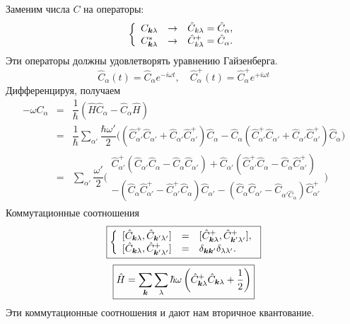 Заменим числа $C$ на операторы:
$$
\left\{
  \begin{array}{lcl}
    C_{\bf k \lambda} & \to & \hat C_{k \lambda} = \hat C_{\alpha} ,\\
    C^\ast_{\bf k \lambda} & \to & \hat C_{k \lambda}^{+} = \hat C_{\alpha} .
  \end{array}
\right.
$$ 
Эти операторы должны удовлетворять уравнению Гайзенберга.
$$
    \hat C_{\alpha} (t) = \hat C_{\alpha} e^{- i \omega t}, \quad
    \hat C_{\alpha}^{+} (t) = \hat C_{\alpha}^+ e^{+ i \omega t}
$$
Дифференцируя, получаем
\begin{eqnarray*}
    - \omega C_{\alpha} &=& \dfrac{1}{\hbar} (\hat H \hat C_{\alpha} - \hat C_{\alpha} \hat H)\\
&=& \dfrac{1}{\hbar} \sum_{\alpha'} \dfrac{\hbar \omega'}{2}\Big(
    (\hat C_{\alpha'}^{+} \hat C_{\alpha'} + \hat C_{\alpha'} \hat C_{\alpha'}^{+}) \hat C_{\alpha} - 
\hat C_{\alpha}(\hat C_{\alpha'}^{+} \hat C_{\alpha'} + \hat C_{\alpha'} \hat C_{\alpha'}^{+}) \hat C_{\alpha}
\Big)\\
&=& \sum_{\alpha'} \dfrac{\omega'}{2} \Big(
\begin{array}{c}
      \hat C_{\alpha'}^{+} (\hat C_{\alpha'} \hat C_{\alpha} - \hat C_{\alpha} \hat C_{\alpha'}) +
\hat C_{\alpha'} (\hat C_{\alpha'}^{+} \hat C_{\alpha} - \hat C_{\alpha}\hat C_{\alpha'}^{+})
 \\
  - (\hat C_{\alpha} \hat C_{\alpha'}^{+} - \hat C_{\alpha'}^{+} \hat C_{\alpha}) \hat C_{\alpha'}
- (\hat C_{\alpha} \hat C_{\alpha'} - \hat C_{\alpha' \hat C_{\alpha}}) \hat C_{\alpha'}^{+}
\end{array}
\Big)
\end{eqnarray*}
Коммутационные соотношения
$$
\boxed{
    \left\{
      \begin{array}{lcl}
        [\hat C_{\bf k \lambda}, \hat C_{\bf k' \lambda'}] & = & [\hat C_{\bf k \lambda}^+, \hat C_{\bf k' \lambda'}^+] ,\\{}
        [\hat C_{\bf k \lambda}, \hat C_{\bf k' \lambda'}^+] & = & \dta_{\bf k \bf k'} \dta_{\lambda \lambda'}.
      \end{array}
    \right.
}
$$
$$
    \boxed{
    \hat H = \sum_{\bf k} \sum_{\lambda} \hbar \omega \left(
    \hat C_{\bf k \lambda}^+ \hat C_{\bf k \lambda} + \dfrac{1}{2}
\right)
}
$$
Эти коммутационные соотношения и дают нам вторичное квантование.    